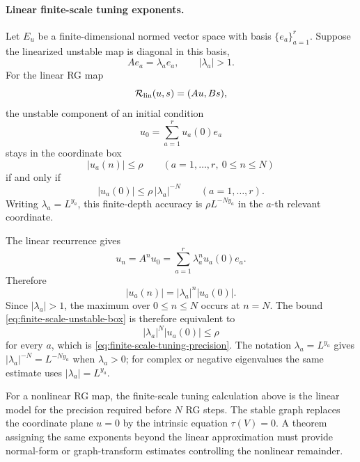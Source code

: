 \paragraph{Linear finite-scale tuning exponents.}
Let \(E_u\) be a finite-dimensional normed vector space with basis
\(\{e_a\}_{a=1}^r\).  Suppose the linearized unstable map is diagonal in this
basis,
\[
  A e_a=\lambda_a e_a,
  \qquad |\lambda_a|>1 .
\]
For the linear RG map
\[
  \mathcal R_{\rm lin}(u,s)=(Au,Bs),
\]
the unstable component of an initial condition
\[
  u_0=\sum_{a=1}^r u_a(0)e_a
\]
stays in the coordinate box
\begin{equation}
  |u_a(n)|\leq \rho
  \qquad (a=1,\ldots,r,\ 0\leq n\leq N)
  \label{eq:finite-scale-unstable-box}
\end{equation}
if and only if
\begin{equation}
  |u_a(0)|\leq \rho\,|\lambda_a|^{-N}
  \qquad (a=1,\ldots,r).
  \label{eq:finite-scale-tuning-precision}
\end{equation}
Writing \(\lambda_a=L^{y_a}\), this finite-depth accuracy is
\(\rho L^{-Ny_a}\) in the \(a\)-th relevant coordinate.

The linear recurrence gives
\[
  u_n=A^n u_0
  =
  \sum_{a=1}^r \lambda_a^n u_a(0)e_a .
\]
Therefore
\[
  |u_a(n)|=|\lambda_a|^n |u_a(0)|.
\]
Since \(|\lambda_a|>1\), the maximum over \(0\leq n\leq N\) occurs at
\(n=N\).  The bound \eqref{eq:finite-scale-unstable-box} is therefore
equivalent to
\[
  |\lambda_a|^N |u_a(0)|\leq\rho
\]
for every \(a\), which is
\eqref{eq:finite-scale-tuning-precision}.  The notation
\(\lambda_a=L^{y_a}\) gives \(|\lambda_a|^{-N}=L^{-Ny_a}\) when
\(\lambda_a>0\); for complex or negative eigenvalues the same estimate uses
\(|\lambda_a|=L^{y_a}\).

For a nonlinear RG map,
the finite-scale tuning calculation above is the linear model for the
precision required before \(N\) RG steps.  The stable graph
replaces the coordinate plane \(u=0\) by the intrinsic equation
\(\tau(V)=0\).  A theorem assigning the same exponents beyond the linear
approximation must provide normal-form or graph-transform estimates
controlling the nonlinear remainder.

